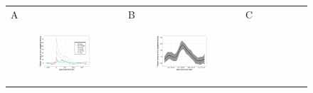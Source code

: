 \documentclass[11pt]{article}
\begin{document}
\begin{figure}[ht]
	\begin{tabular}{lll}
	A&B&C\\
	\begin{subfigure}[t]{0.30\linewidth}
		\centering
		\includegraphics[width=1\linewidth]{figs/figure-1a.pdf} 
	\end{subfigure}&
	\begin{subfigure}[t]{0.30\linewidth}
		\centering
		\includegraphics[width=1\linewidth]{figs/figure-1b.pdf}
	\end{subfigure}&
	\begin{subfigure}[t]{0.30\linewidth}
		\centering

\end{subfigure}
\end{tabular}
\end{figure}
\end{document}
